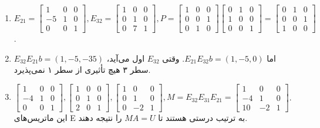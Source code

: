 \documentclass[12pt]{article}
\begin{document}
	
	
	\begin{enumerate}
		
		\item $E_{21}=
		\begin{bmatrix}
			1 & 0 & 0 \\
			-5 & 1 & 0 \\
			0 & 0 & 1
		\end{bmatrix} ,E_{32}=
		\begin{bmatrix}
			1 & 0 & 0 \\
			0 & 1 & 0 \\
			0 & 7 & 1
		\end{bmatrix} ,P=
		\begin{bmatrix}
			1 & 0 & 0 \\
			0 & 0 & 1 \\
			0 & 1 & 0
		\end{bmatrix}
		\begin{bmatrix}
			0 & 1 & 0 \\
			1 & 0 & 0 \\
			0 & 0 & 1
		\end{bmatrix}=
		\begin{bmatrix}
			0 & 1 & 0 \\
			0 & 0 & 1 \\
			1 & 0 & 0
		\end{bmatrix}$.
		
		\item $E_{32}E_{21}b=(1,-5,-35)$ اما $E_{21}E_{32}b=(1,-5,0)$. وقتی $E_{32}$ اول می‌آید، سطر ۳ هیچ تأثیری از سطر ۱ نمی‌پذیرد.
		
		\item $\begin{bmatrix} 1 & 0 & 0 \\ -4 & 1 & 0 \\ 0 & 0 & 1 \end{bmatrix}, \begin{bmatrix} 1 & 0 & 0 \\ 0 & 1 & 0 \\ 2 & 0 & 1 \end{bmatrix}, \begin{bmatrix} 1 & 0 & 0 \\ 0 & 1 & 0 \\ 0 & -2 & 1 \end{bmatrix}, M=E_{32}E_{31}E_{21} = \begin{bmatrix} 1 & 0 & 0 \\ -4 & 1 & 0 \\ 10 & -2 & 1 \end{bmatrix}$. این ماتریس‌های E به ترتیب درستی هستند تا $MA=U$ را نتیجه دهند.
		

\end{enumerate}
\end{document}
